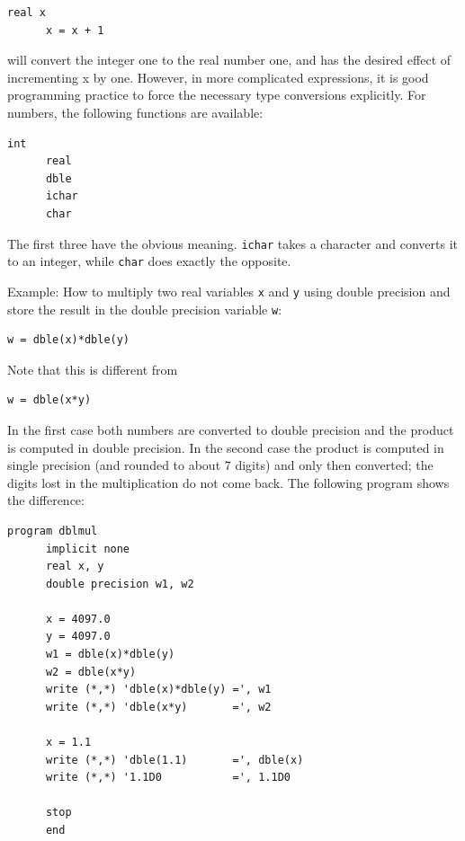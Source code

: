 \begin{lstlisting}[style=fortran77]
      real x
      x = x + 1
\end{lstlisting}

will convert the integer one to the real number one, and has the desired effect of incrementing x by one. However, in more complicated expressions, it is good programming practice to force the necessary type conversions explicitly. For numbers, the following functions are available:

\begin{lstlisting}[style=fortran77]
      int
      real
      dble
      ichar
      char
\end{lstlisting}

The first three have the obvious meaning. \texttt{ichar} takes a character and converts it to an integer, while \texttt{char} does exactly the opposite.

Example: How to multiply two real variables \texttt{x} and \texttt{y} using double precision and store the result in the double precision variable \texttt{w}:

\begin{lstlisting}[style=fortran77]
      w = dble(x)*dble(y)
\end{lstlisting}

Note that this is different from

\begin{lstlisting}[style=fortran77]
      w = dble(x*y)
\end{lstlisting}

In the first case both numbers are converted to double precision and the product is computed in double precision. In the second case the product is computed in single precision (and rounded to about 7 digits) and only then converted; the digits lost in the multiplication do not come back. The following program shows the difference:

\begin{lstlisting}[style=fortran77]
      program dblmul
      implicit none
      real x, y
      double precision w1, w2

      x = 4097.0
      y = 4097.0
      w1 = dble(x)*dble(y)
      w2 = dble(x*y)
      write (*,*) 'dble(x)*dble(y) =', w1
      write (*,*) 'dble(x*y)       =', w2

      x = 1.1
      write (*,*) 'dble(1.1)       =', dble(x)
      write (*,*) '1.1D0           =', 1.1D0

      stop
      end
\end{lstlisting}

